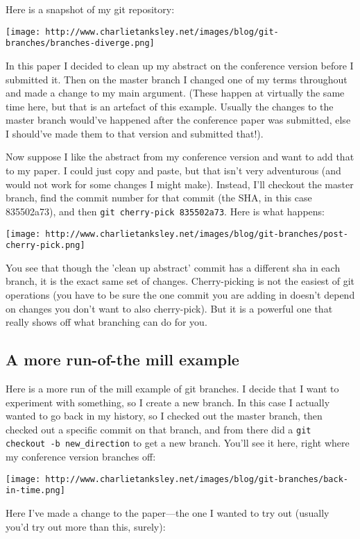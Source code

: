 \documentclass{article}
\begin{document}
Here is a snapshot of my git repository:

\texttt{[image: http://www.charlietanksley.net/images/blog/git-branches/branches-diverge.png]}

In this paper I decided to clean up my abstract on the conference
version before I submitted it. Then on the master branch I changed
one of my terms throughout and made a change to my main argument.
(These happen at virtually the same time here, but that is an
artefact of this example. Usually the changes to the master branch
would've happened after the conference paper was submitted, else I
should've made them to that version and submitted that!).

Now suppose I like the abstract from my conference version and want
to add that to my paper. I could just copy and paste, but that
isn't very adventurous (and would not work for some changes I might
make). Instead, I'll checkout the master branch, find the commit
number for that commit (the SHA, in this case 835502a73), and then
\verb!git cherry-pick 835502a73!. Here is what happens:

\texttt{[image: http://www.charlietanksley.net/images/blog/git-branches/post-cherry-pick.png]}

You see that though the 'clean up abstract' commit has a different
sha in each branch, it is the exact same set of changes.
Cherry-picking is not the easiest of git operations (you have to be
sure the one commit you are adding in doesn't depend on changes you
don't want to also cherry-pick). But it is a powerful one that
really shows off what branching can do for you.

\subsection{A more run-of-the mill example}

Here is a more run of the mill example of git branches. I decide
that I want to experiment with something, so I create a new branch.
In this case I actually wanted to go back in my history, so I
checked out the master branch, then checked out a specific commit
on that branch, and from there did a
\verb!git checkout -b new_direction! to get a new branch. You'll
see it here, right where my conference version branches off:

\texttt{[image: http://www.charlietanksley.net/images/blog/git-branches/back-in-time.png]}

Here I've made a change to the paper—the one I wanted to try out
(usually you'd try out more than this, surely):
\end{document}
